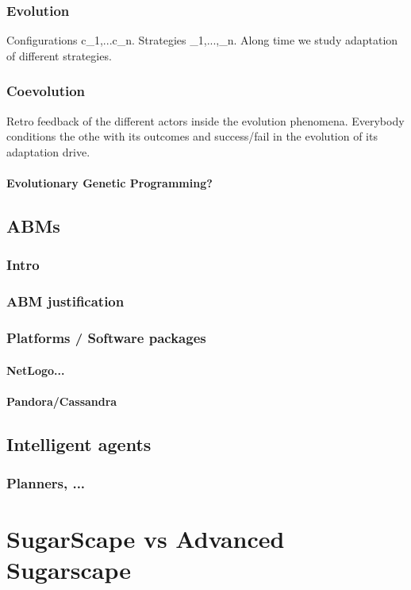 \documentclass{report}
\begin{document}
		\subsection{Evolution}

Configurations c_1,...c_n. Strategies \sigma_1,...,\sigma_n. Along time we study adaptation
of different strategies. 

		\subsection{Coevolution}

Retro feedback of the different actors inside the evolution phenomena.
Everybody conditions the othe with its outcomes and success/fail in the evolution of
its adaptation drive.


			\subsubsection{Evolutionary \/ Genetic Programming?}
	\section{ABMs}
	  \subsection{Intro}
	  \subsection{ABM justification}		
	   \subsection{Platforms / Software packages}
		\subsubsection{NetLogo...}
		\subsubsection{Pandora/Cassandra}
	\section{Intelligent agents}
	  \subsection{Planners, ...}
\newpage 	
\chapter{SugarScape vs Advanced Sugarscape}
\end{document}

